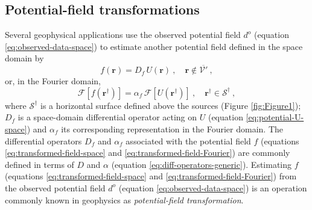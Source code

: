 \documentclass[manuscript,noblind]{geophysics}
\begin{document}
	\subsection{Potential-field transformations}
	\label{subsec:potential_field_transformations}
	
	Several geophysical applications use the observed potential field 
	$d^{o}$ (equation \ref{eq:observed-data-space}) to estimate another potential field 
	defined in the space domain by
	\begin{equation}
		f(\mathbf{r}) = D_{f} \, U(\mathbf{r}) \: , 
		\quad \mathbf{r} \notin \overline{\mathcal{V}'} \: ,
		\label{eq:transformed-field-space}
	\end{equation}
	or, in the Fourier domain, 
	\begin{equation}
		\mathcal{F} [ f(\mathbf{r}^{\dagger}) ] =
		\alpha_{f} \, \mathcal{F} [ U(\mathbf{r}^{\dagger}) ] \: ,
		\quad \mathbf{r}^{\dagger} \in \mathcal{S}^{\dagger} \: ,
		\label{eq:transformed-field-Fourier}
	\end{equation}
	where $\mathcal{S}^{\dagger}$ is a horizontal surface defined above the sources (Figure \ref{fig:Figure1});
	$D_{f}$ is a space-domain differential operator acting on $U$ (equation \ref{eq:potential-U-space}) and
	$\alpha_{f}$ its corresponding representation in the Fourier domain.
	The differential operators $D_{f}$ and $\alpha_{f}$ associated with the potential field 
	$f$ (equations \ref{eq:transformed-field-space} and \ref{eq:transformed-field-Fourier}) are commonly
	defined in terms of $D$ and $\alpha$ (equation \ref{eq:diff-operators-generic}). 
	Estimating $f$ (equations \ref{eq:transformed-field-space} and \ref{eq:transformed-field-Fourier}) from 
	the observed potential field $d^{o}$ (equation \ref{eq:observed-data-space}) is an operation 
	commonly known in geophysics as \textit{potential-field transformation}.
	
\end{document}
